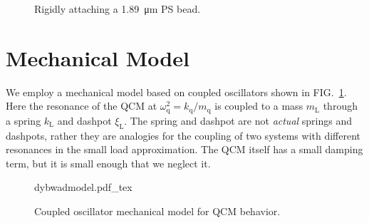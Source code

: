 \documentclass[floatfix,superscriptaddress,a4paper,notitlepage]{revtex4-1}
\newcommand{\Figure}[1]{FIG.~\ref{#1}}
\newcommand{\df}{\Delta\!f}
\newcommand{\dg}{\Delta\Gamma}
\newcommand{\xil}{\xi_\mathrm{L}}
\newcommand{\kl}{k_\mathrm{L}}
\newcommand{\ml}{m_\mathrm{L}}
\newcommand{\kq}{k_\mathrm{q}}
\newcommand{\mq}{m_\mathrm{q}}
\newcommand{\omegaq}{\omega_\mathrm{q}}
\begin{document}
\begin{figure}[h]
\centering
 \caption{Rigidly attaching a \SI{1.89}{\micro\meter} PS bead.}
\end{figure}

\section{Mechanical Model}
We employ a mechanical model based on coupled oscillators shown in
\Figure{fig:mechanicalmodel}.  Here the resonance of the QCM at
$\omegaq^2=\kq/\mq$ is coupled to a mass $\ml$ through a spring $\kl$ and
dashpot $\xil$.  The spring and dashpot are not \textit{actual} springs and
dashpots, rather they are analogies for the coupling of two systems with
different resonances in the small load approximation.  The QCM itself has a
small damping term, but it is small enough that we neglect it.
\begin{figure}[ht]
 \centering
 {dybwadmodel.pdf_tex}
 \caption{Coupled oscillator mechanical model for QCM behavior.}
\label{fig:mechanicalmodel}
\end{figure}
\end{document}
